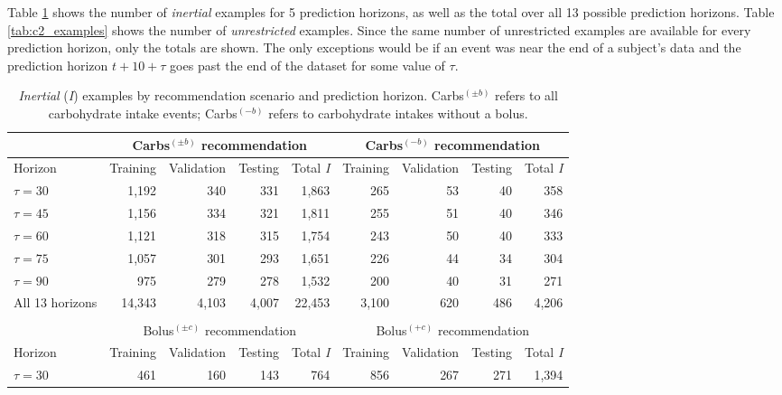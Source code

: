 \documentclass[journal,article,submit,moreauthors,pdftex]{Definitions/mdpi}
\begin{document}
Table \ref{tab:c1_examples} shows the number of {\it inertial} examples for 5 prediction horizons, as well as the total over all 13 possible prediction horizons. Table \ref{tab:c2_examples} shows the number of {\it unrestricted} examples. Since the same number of unrestricted examples are available for every prediction horizon, only the totals are shown. The only exceptions would be if an event was near the end of a subject's data and the prediction horizon $t+10+\tau$ goes past the end of the dataset for some value of $\tau$.

\begin{table}[ht]\setlength{\tabcolsep}{4pt}
\begin{center}
\caption{{\it Inertial} ({\it I}) examples by recommendation scenario and prediction horizon. Carbs$^{(\pm b)}$ refers to all carbohydrate intake events; Carbs$^{(-b)}$ refers to carbohydrate intakes without a bolus.}
\label{tab:c1_examples}
\begin{tabular}{|l|rrrr|rrrr|}
    \cline{2-9}
    \multicolumn{1}{c}{}& \multicolumn{4}{|c|}{Carbs$^{(\pm b)}$ recommendation} & \multicolumn{4}{c|}{Carbs$^{(-b)}$ recommendation}\\
    \hline
    Horizon & Training & Validation & Testing & Total {\it I} & Training & Validation & Testing & Total {\it I}\\
    \hline
    $\tau=30$ & 1,192 & 340 & 331 & 1,863 & 265 & 53 & 40 & 358\\
    $\tau=45$ & 1,156 & 334 & 321 & 1,811 & 255 & 51 & 40 & 346\\ 
    $\tau=60$ & 1,121 & 318 & 315 & 1,754 & 243 & 50 & 40 & 333\\
    $\tau=75$ & 1,057 & 301 & 293 & 1,651 & 226 & 44 & 34 & 304\\ 
    $\tau=90$ & 975 & 279 & 278 & 1,532 & 200 & 40 & 31 & 271\\
    All 13 horizons & 14,343 & 4,103 & 4,007 & 22,453 & 3,100 & 620 & 486 & 4,206\\
    \hline
	\multicolumn{5}{c}{}\\[-1.5ex]
	\cline{2-9}
    \multicolumn{1}{c}{} & \multicolumn{4}{|c|}{Bolus$^{(\pm c)}$ recommendation} & \multicolumn{4}{c|}{Bolus$^{(+ c)}$ recommendation}\\
    \hline
    Horizon & Training & Validation & Testing & Total {\it I} & Training & Validation & Testing & Total {\it I}\\
    \hline
    $\tau=30$ & 461 & 160 & 143 & 764 & 856 & 267 & 271 & 1,394\\

\end{tabular}
\end{center}
\end{table}
\end{document}
